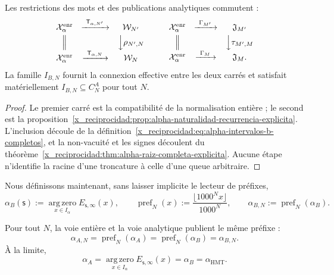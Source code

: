 \begin{proposition}
\label{x_reciprocidad:prop:alpha-cuadrados-compatibilidad}
Les restrictions des mots et des publications analytiques commutent :
\[
\begin{array}{ccc}
 \mathcal X_\alpha^{\mathrm{enr}}&
 \xrightarrow{\ \mathsf T_{\alpha,N'}\ }&\mathcal W_{N'}\\[1mm]
 \Big\Vert&&\Big\downarrow\rho_{N',N}\\[1mm]
 \mathcal X_\alpha^{\mathrm{enr}}&
 \xrightarrow{\ \mathsf T_{\alpha,N}\ }&\mathcal W_N
\end{array}
\qquad
\begin{array}{ccc}
 \mathcal X_\alpha^{\mathrm{enr}}&
 \xrightarrow{\ \Gamma_{M'}\ }&\mathfrak J_{M'}\\[1mm]
 \Big\Vert&&\Big\downarrow\tau_{M',M}\\[1mm]
 \mathcal X_\alpha^{\mathrm{enr}}&
 \xrightarrow{\ \Gamma_M\ }&\mathfrak J_M .
\end{array}
\]
La famille \(I_{B,N}\) fournit la connexion effective entre les deux
carrés et satisfait matériellement
\(I_{B,N}\subseteq C_N^A\) pour tout \(N\).
\end{proposition}

\begin{proof}
Le premier carré est la compatibilité de la normalisation entière ; le second est la proposition~\ref{x_reciprocidad:prop:alpha-naturalidad-recurrencia-explicita}. L'inclusion découle de la définition~\eqref{x_reciprocidad:eq:alpha-intervalos-b-completos}, et la non-vacuité et les signes découlent du théorème~\ref{x_reciprocidad:thm:alpha-raiz-completa-explicita}. Aucune étape n'identifie la racine d'une troncature à celle d'une queue arbitraire.
\end{proof}

Nous définissons maintenant, sans laisser implicite le lecteur de préfixes,
\begin{equation}
 \alpha_B(\mathsf s):=
 \operatorname*{arg\,zero}_{x\in I_\alpha}E_{\mathsf s,\infty}(x),
 \qquad
 \operatorname{pref}_N(x):=
 \frac{\lfloor1000^Nx\rfloor}{1000^N},
 \qquad
 \alpha_{B,N}:=\operatorname{pref}_N(\alpha_B).
 \label{x_reciprocidad:eq:alpha-definicion-b-y-prefijos-rev08}
\end{equation}

\begin{theorem}
\label{x_reciprocidad:thm:alpha-dos-publicaciones-completas}
Pour tout \(N\), la voie entière et la voie analytique publient le même préfixe :
\begin{equation}
 \boxed{\alpha_{A,N}=\operatorname{pref}_N(\alpha_A)
 =\operatorname{pref}_N(\alpha_B)=\alpha_{B,N}.}
 \label{x_reciprocidad:eq:alpha-dos-vias-cada-nivel}
\end{equation}
À la limite,
\begin{equation}
 \boxed{\alpha_A
 =\operatorname*{arg\,zero}_{x\in I_\alpha}
       E_{\mathsf s,\infty}(x)
 =\alpha_B=\alpha_{\mathrm{HMT}}.}
 \label{x_reciprocidad:eq:alpha-dos-vias-limite-coinductivo}
\end{equation}
\end{theorem}

